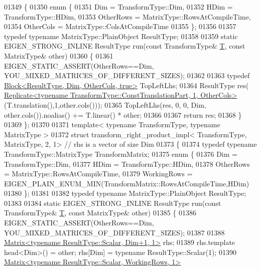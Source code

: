 \begin{DoxyCode}
01349 \{
01350   \textcolor{keyword}{enum} \{ 
01351     Dim = TransformType::Dim, 
01352     HDim = TransformType::HDim,
01353     OtherRows = MatrixType::RowsAtCompileTime,
01354     OtherCols = MatrixType::ColsAtCompileTime
01355   \};
01356 
01357   \textcolor{keyword}{typedef} \textcolor{keyword}{typename} MatrixType::PlainObject ResultType;
01358 
01359   \textcolor{keyword}{static} EIGEN\_STRONG\_INLINE ResultType run(\textcolor{keyword}{const} TransformType& \hyperlink{group___sparse_core___module}{T}, \textcolor{keyword}{const} MatrixType& other)
01360   \{
01361     EIGEN\_STATIC\_ASSERT(OtherRows==Dim, YOU\_MIXED\_MATRICES\_OF\_DIFFERENT\_SIZES);
01362 
01363     \textcolor{keyword}{typedef} \hyperlink{group___core___module_class_eigen_1_1_block}{Block<ResultType, Dim, OtherCols, true>} TopLeftLhs;
01364     ResultType res(
      \hyperlink{group___core___module_class_eigen_1_1_replicate}{Replicate<typename TransformType::ConstTranslationPart, 1, OtherCols>}
      (T.translation(),1,other.cols()));
01365     TopLeftLhs(res, 0, 0, Dim, other.cols()).noalias() += T.linear() * other;
01366 
01367     \textcolor{keywordflow}{return} res;
01368   \}
01369 \};
01370 
01371 \textcolor{keyword}{template}< \textcolor{keyword}{typename} TransformType, \textcolor{keyword}{typename} MatrixType >
01372 \textcolor{keyword}{struct }transform\_right\_product\_impl< TransformType, MatrixType, 2, 1> \textcolor{comment}{// rhs is a vector of size Dim}
01373 \{
01374   \textcolor{keyword}{typedef} \textcolor{keyword}{typename} TransformType::MatrixType TransformMatrix;
01375   \textcolor{keyword}{enum} \{
01376     Dim = TransformType::Dim,
01377     HDim = TransformType::HDim,
01378     OtherRows = MatrixType::RowsAtCompileTime,
01379     WorkingRows = EIGEN\_PLAIN\_ENUM\_MIN(TransformMatrix::RowsAtCompileTime,HDim)
01380   \};
01381 
01382   \textcolor{keyword}{typedef} \textcolor{keyword}{typename} MatrixType::PlainObject ResultType;
01383 
01384   \textcolor{keyword}{static} EIGEN\_STRONG\_INLINE ResultType run(\textcolor{keyword}{const} TransformType& \hyperlink{group___sparse_core___module}{T}, \textcolor{keyword}{const} MatrixType& other)
01385   \{
01386     EIGEN\_STATIC\_ASSERT(OtherRows==Dim, YOU\_MIXED\_MATRICES\_OF\_DIFFERENT\_SIZES);
01387 
01388     \hyperlink{group___core___module_class_eigen_1_1_matrix}{Matrix<typename ResultType::Scalar, Dim+1, 1>} rhs;
01389     rhs.template head<Dim>() = other; rhs[Dim] = \textcolor{keyword}{typename} ResultType::Scalar(1);
01390     \hyperlink{group___core___module_class_eigen_1_1_matrix}{Matrix<typename ResultType::Scalar, WorkingRows, 1>} 

\end{DoxyCode}
